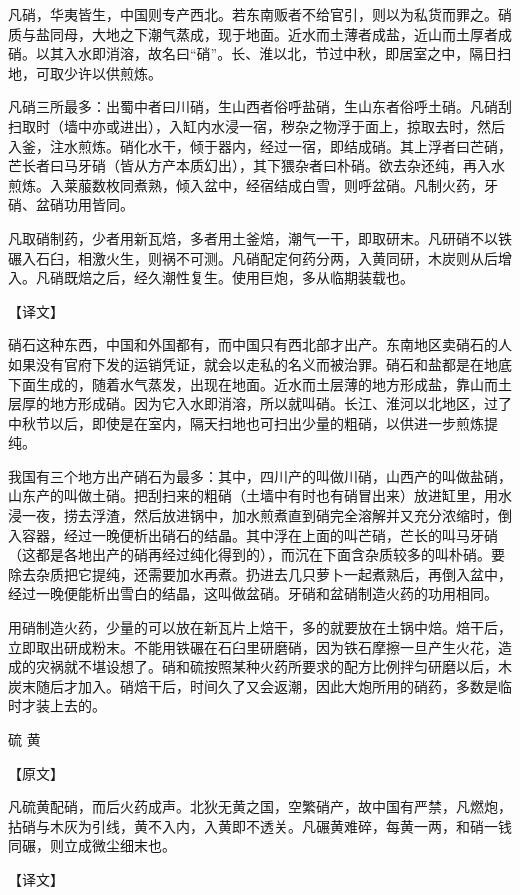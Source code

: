 \documentclass[12pt,UTF8]{ctexbook}
\begin{document}
凡硝，华夷皆生，中国则专产西北。若东南贩者不给官引，则以为私货而罪之。硝质与盐同母，大地之下潮气蒸成，现于地面。近水而土薄者成盐，近山而土厚者成硝。以其入水即消溶，故名曰“硝”。长、淮以北，节过中秋，即居室之中，隔日扫地，可取少许以供煎炼。

凡硝三所最多：出蜀中者曰川硝，生山西者俗呼盐硝，生山东者俗呼土硝。凡硝刮扫取时（墙中亦或进出），入缸内水浸一宿，秽杂之物浮于面上，掠取去时，然后入釜，注水煎炼。硝化水干，倾于器内，经过一宿，即结成硝。其上浮者曰芒硝，芒长者曰马牙硝（皆从方产本质幻出），其下猥杂者曰朴硝。欲去杂还纯，再入水煎炼。入莱菔数枚同煮熟，倾入盆中，经宿结成白雪，则呼盆硝。凡制火药，牙硝、盆硝功用皆同。

凡取硝制药，少者用新瓦焙，多者用土釜焙，潮气一干，即取研末。凡研硝不以铁碾入石臼，相激火生，则祸不可测。凡硝配定何药分两，入黄同研，木炭则从后增入。凡硝既焙之后，经久潮性复生。使用巨炮，多从临期装载也。

【译文】

硝石这种东西，中国和外国都有，而中国只有西北部才出产。东南地区卖硝石的人如果没有官府下发的运销凭证，就会以走私的名义而被治罪。硝石和盐都是在地底下面生成的，随着水气蒸发，出现在地面。近水而土层薄的地方形成盐，靠山而土层厚的地方形成硝。因为它入水即消溶，所以就叫硝。长江、淮河以北地区，过了中秋节以后，即使是在室内，隔天扫地也可扫出少量的粗硝，以供进一步煎炼提纯。

我国有三个地方出产硝石为最多：其中，四川产的叫做川硝，山西产的叫做盐硝，山东产的叫做土硝。把刮扫来的粗硝（土墙中有时也有硝冒出来）放进缸里，用水浸一夜，捞去浮渣，然后放进锅中，加水煎煮直到硝完全溶解并又充分浓缩时，倒入容器，经过一晚便析出硝石的结晶。其中浮在上面的叫芒硝，芒长的叫马牙硝（这都是各地出产的硝再经过纯化得到的），而沉在下面含杂质较多的叫朴硝。要除去杂质把它提纯，还需要加水再煮。扔进去几只萝卜一起煮熟后，再倒入盆中，经过一晚便能析出雪白的结晶，这叫做盆硝。牙硝和盆硝制造火药的功用相同。

用硝制造火药，少量的可以放在新瓦片上焙干，多的就要放在土锅中焙。焙干后，立即取出研成粉末。不能用铁碾在石臼里研磨硝，因为铁石摩擦一旦产生火花，造成的灾祸就不堪设想了。硝和硫按照某种火药所要求的配方比例拌匀研磨以后，木炭末随后才加入。硝焙干后，时间久了又会返潮，因此大炮所用的硝药，多数是临时才装上去的。

硫 黄

【原文】

凡硫黄配硝，而后火药成声。北狄无黄之国，空繁硝产，故中国有严禁，凡燃炮，拈硝与木灰为引线，黄不入内，入黄即不透关。凡碾黄难碎，每黄一两，和硝一钱同碾，则立成微尘细末也。

【译文】
\end{document}
